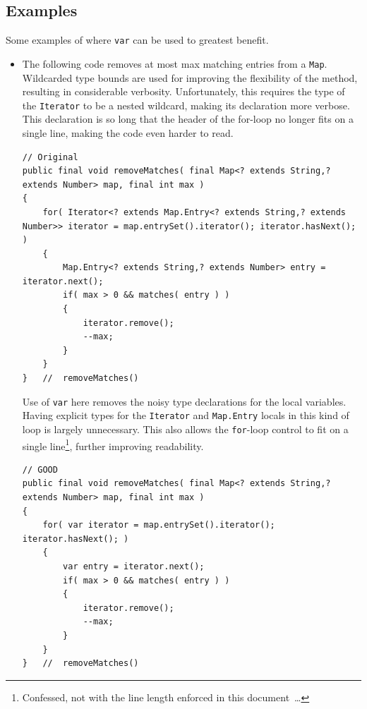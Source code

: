 \documentclass[11pt,a4paper, titlepage, parskip=half, headsepline, footsepline, cleardoublepage=current, headheight=1cm]{scrbook}
\begin{document}

\subsection{Examples}
Some examples of where \lstinline|var| can be used to greatest benefit.

\begin{itemize}
\item{The following code removes at most max matching entries from a \lstinline|Map|\autocite{ORACLE_DOC_MAP_INTERFACE}. Wildcarded type bounds are used for improving the flexibility of the method, resulting in considerable verbosity. Unfortunately, this requires the type of the \lstinline|Iterator|\autocite{ORACLE_DOC_ITERATOR_INTERFACE} to be a nested wildcard, making its declaration more verbose. This declaration is so long that the header of the for-loop no longer fits on a single line, making the code even harder to read.
\begin{lstlisting}
// Original
public final void removeMatches( final Map<? extends String,? extends Number> map, final int max ) 
{
    for( Iterator<? extends Map.Entry<? extends String,? extends Number>> iterator = map.entrySet().iterator(); iterator.hasNext(); ) 
    {
        Map.Entry<? extends String,? extends Number> entry = iterator.next();
        if( max > 0 && matches( entry ) ) 
        {
            iterator.remove();
            --max;
        }
    }
}   //  removeMatches()
\end{lstlisting}

Use of \lstinline|var| here removes the noisy type declarations for the local variables. Having explicit types for the \lstinline|Iterator| and \lstinline|Map.Entry|\autocite{ORACLE_DOC_MAP.ENTRY_INTERFACE} locals in this kind of loop is largely unnecessary. This also allows the \lstinline|for|-loop control to fit on a single line\footnote{Confessed, not with the line length enforced in this document~…}, further improving readability.
\begin{lstlisting}
// GOOD
public final void removeMatches( final Map<? extends String,? extends Number> map, final int max ) 
{
    for( var iterator = map.entrySet().iterator(); iterator.hasNext(); ) 
    {
        var entry = iterator.next();
        if( max > 0 && matches( entry ) ) 
        {
            iterator.remove();
            --max;
        }
    }
}   //  removeMatches()
\end{lstlisting}}


\end{itemize}
\end{document}
